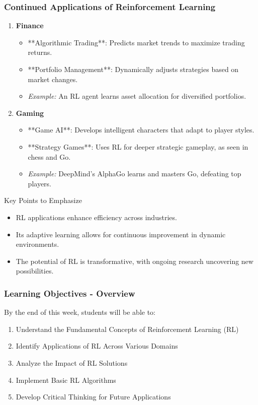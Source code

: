 \documentclass{beamer}
\begin{document}
\begin{frame}[fragile]
    \frametitle{Continued Applications of Reinforcement Learning}
    \begin{enumerate}[resume]
        \item \textbf{Finance}
        \begin{itemize}
            \item **Algorithmic Trading**: Predicts market trends to maximize trading returns.
            \item **Portfolio Management**: Dynamically adjusts strategies based on market changes.
            \item \textit{Example:} An RL agent learns asset allocation for diversified portfolios.
        \end{itemize}
        
        \item \textbf{Gaming}
        \begin{itemize}
            \item **Game AI**: Develops intelligent characters that adapt to player styles.
            \item **Strategy Games**: Uses RL for deeper strategic gameplay, as seen in chess and Go.
            \item \textit{Example:} DeepMind’s AlphaGo learns and masters Go, defeating top players.
        \end{itemize}
    \end{enumerate}

    \begin{block}{Key Points to Emphasize}
        \begin{itemize}
            \item RL applications enhance efficiency across industries.
            \item Its adaptive learning allows for continuous improvement in dynamic environments.
            \item The potential of RL is transformative, with ongoing research uncovering new possibilities.
        \end{itemize}
    \end{block}
\end{frame}

\begin{frame}[fragile]
    \frametitle{Learning Objectives - Overview}
    By the end of this week, students will be able to:
    \begin{enumerate}
        \item Understand the Fundamental Concepts of Reinforcement Learning (RL)
        \item Identify Applications of RL Across Various Domains
        \item Analyze the Impact of RL Solutions
        \item Implement Basic RL Algorithms
        \item Develop Critical Thinking for Future Applications
    \end{enumerate}
\end{frame}
\end{document}
